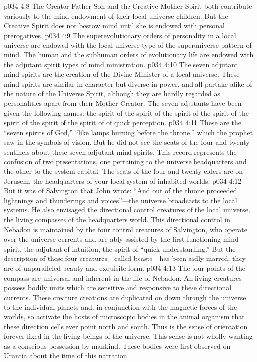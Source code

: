 \pc \vs p034 4:8 The Creator Father\hyp{}Son and the Creative Mother Spirit both contribute variously to the mind endowment of their local universe children. But the Creative Spirit does not bestow mind until she is endowed with personal prerogatives.
\vs p034 4:9 The superevolutionary orders of personality in a local universe are endowed with the local universe type of the superuniverse pattern of mind. The human and the subhuman orders of evolutionary life are endowed with the adjutant spirit types of mind ministration.
\pc \vs p034 4:10 The seven adjutant mind\hyp{}spirits are the creation of the Divine Minister of a local universe. These mind\hyp{}spirits are similar in character but diverse in power, and all partake alike of the nature of the Universe Spirit, although they are hardly regarded as personalities apart from their Mother Creator. The seven adjutants have been given the following names: the spirit of  the spirit of  the spirit of  the spirit of  the spirit of  the spirit of  the spirit of of quick perception.
\pc \vs p034 4:11 These are the “seven spirits of God,” “like lamps burning before the throne,” which the prophet saw in the symbols of vision. But he did not see the seats of the four and twenty sentinels about these seven adjutant mind\hyp{}spirits. This record represents the confusion of two presentations, one pertaining to the universe headquarters and the other to the system capital. The seats of the four and twenty elders are on Jerusem, the headquarters of your local system of inhabited worlds.
\vs p034 4:12 But it was of Salvington that John wrote: “And out of the throne proceeded lightnings and thunderings and voices”---the universe broadcasts to the local systems. He also envisaged the directional control creatures of the local universe, the living compasses of the headquarters world. This directional control in Nebadon is maintained by the four control creatures of Salvington, who operate over the universe currents and are ably assisted by the first functioning mind\hyp{}spirit, the adjutant of intuition, the spirit of “quick understanding.” But the description of these four creatures---called beasts---has been sadly marred; they are of unparalleled beauty and exquisite form.
\vs p034 4:13 The four points of the compass are universal and inherent in the life of Nebadon. All living creatures possess bodily units which are sensitive and responsive to these directional currents. These creature creations are duplicated on down through the universe to the individual planets and, in conjunction with the magnetic forces of the worlds, so activate the hosts of microscopic bodies in the animal organism that these direction cells ever point north and south. Thus is the sense of orientation forever fixed in the living beings of the universe. This sense is not wholly wanting as a conscious possession by mankind. These bodies were first observed on Urantia about the time of this narration.
